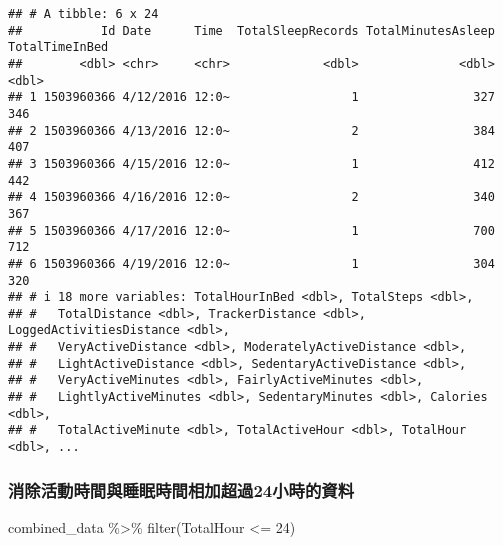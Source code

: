 \documentclass[
]{article}
\newenvironment{Shaded}{\begin{snugshade}}{\end{snugshade}}
\newcommand{\DecValTok}[1]{\textcolor[rgb]{0.00,0.00,0.81}{#1}}
\newcommand{\FunctionTok}[1]{\textcolor[rgb]{0.00,0.00,0.00}{#1}}
\newcommand{\NormalTok}[1]{#1}
\newcommand{\SpecialCharTok}[1]{\textcolor[rgb]{0.00,0.00,0.00}{#1}}
\begin{document}
\begin{verbatim}
## # A tibble: 6 x 24
##           Id Date      Time  TotalSleepRecords TotalMinutesAsleep TotalTimeInBed
##        <dbl> <chr>     <chr>             <dbl>              <dbl>          <dbl>
## 1 1503960366 4/12/2016 12:0~                 1                327            346
## 2 1503960366 4/13/2016 12:0~                 2                384            407
## 3 1503960366 4/15/2016 12:0~                 1                412            442
## 4 1503960366 4/16/2016 12:0~                 2                340            367
## 5 1503960366 4/17/2016 12:0~                 1                700            712
## 6 1503960366 4/19/2016 12:0~                 1                304            320
## # i 18 more variables: TotalHourInBed <dbl>, TotalSteps <dbl>,
## #   TotalDistance <dbl>, TrackerDistance <dbl>, LoggedActivitiesDistance <dbl>,
## #   VeryActiveDistance <dbl>, ModeratelyActiveDistance <dbl>,
## #   LightActiveDistance <dbl>, SedentaryActiveDistance <dbl>,
## #   VeryActiveMinutes <dbl>, FairlyActiveMinutes <dbl>,
## #   LightlyActiveMinutes <dbl>, SedentaryMinutes <dbl>, Calories <dbl>,
## #   TotalActiveMinute <dbl>, TotalActiveHour <dbl>, TotalHour <dbl>, ...
\end{verbatim}

\hypertarget{ux6d88ux9664ux6d3bux52d5ux6642ux9593ux8207ux7761ux7720ux6642ux9593ux76f8ux52a0ux8d85ux904e24ux5c0fux6642ux7684ux8cc7ux6599}{%
\subsubsection{消除活動時間與睡眠時間相加超過24小時的資料}\label{ux6d88ux9664ux6d3bux52d5ux6642ux9593ux8207ux7761ux7720ux6642ux9593ux76f8ux52a0ux8d85ux904e24ux5c0fux6642ux7684ux8cc7ux6599}}

\begin{Shaded}
\begin{Highlighting}[]
\NormalTok{combined\_data }\SpecialCharTok{\%\textgreater{}\%} \FunctionTok{filter}\NormalTok{(TotalHour }\SpecialCharTok{\textless{}=} \DecValTok{24}\NormalTok{)}
\end{Highlighting}
\end{Shaded}
\end{document}
